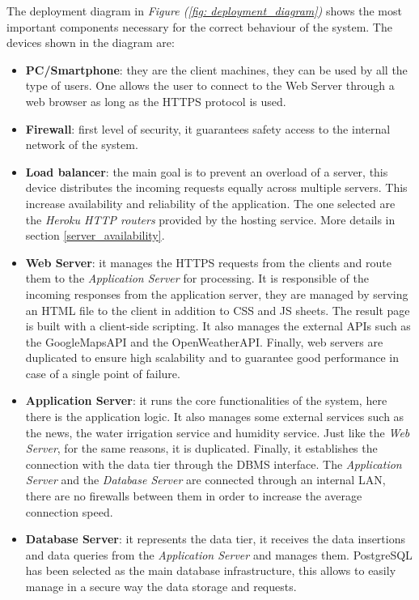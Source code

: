 \documentclass[table, 12pt]{article}
\begin{document}
The deployment diagram in \textit{Figure (\ref{fig: deployment_diagram})} shows the most important components necessary for the correct behaviour of the system.
The devices shown in the diagram are:
\begin{itemize}
    \item \textbf{PC/Smartphone}: they are the client machines, they can be used by all the type of users.
    One allows the user to connect to the Web Server through a web browser as long as the HTTPS protocol is used.
    \item \textbf{Firewall}: first level of security, it guarantees safety access to the internal network of the system.
    \item \textbf{Load balancer}: the main goal is to prevent an overload of a server, this device distributes the incoming requests equally across multiple servers.
    This increase availability and reliability of the application.
    The one selected are the \textit{Heroku HTTP routers} provided by the hosting service. More details in section \ref{server_availability}.
    \item \textbf{Web Server}: it manages the HTTPS requests from the clients and route them to the \textit{Application Server} for processing.
    It is responsible of the incoming responses from the application server, they are managed by serving an HTML file to the client in addition to CSS and JS sheets.
    The result page is built with a client-side scripting.
    It also manages the external APIs such as the GoogleMapsAPI and the OpenWeatherAPI.
    Finally, web servers are duplicated to ensure high scalability and to guarantee good performance in case of a single point of failure.
    \item \textbf{Application Server}: it runs the core functionalities of the system, here there is the application logic.
    It also manages some external services such as the news, the water irrigation service and humidity service.
    Just like the \textit{Web Server}, for the same reasons, it is duplicated.
    Finally, it establishes the connection with the data tier through the DBMS interface. The \textit{Application Server} and the \textit{Database Server} are connected through an internal LAN, there are no firewalls between them in order to increase the average connection speed.

    \item \textbf{Database Server}: it represents the data tier, it receives the data insertions and data queries from the \textit{Application Server} and manages them.
    PostgreSQL has been selected as the main database infrastructure, this allows to easily manage in a secure way the data storage and requests.
    
\end{itemize}
\newpage
\end{document}
